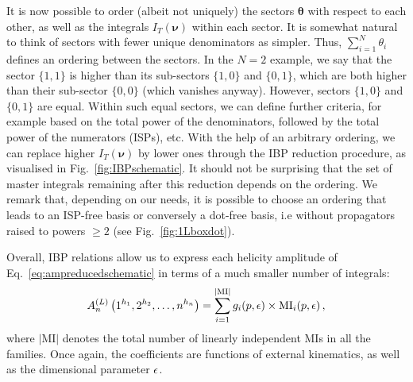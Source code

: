 \documentclass[main.tex]{subfiles}
\begin{document}
It is now possible to order (albeit not uniquely) the sectors $\bm{\theta}$ with respect to each other, as well as the integrals $I_T(\bm{\nu})$ within each sector. It is somewhat natural to think of sectors with fewer unique denominators as simpler. Thus, $\sum_{i=1}^N \theta_i$ defines an ordering between the sectors. In the $N=2$ example, we say that the sector $\{1, 1\}$ is higher than its sub-sectors $\{1, 0\}$ and $\{0, 1\}$, which are both higher than their sub-sector $\{0, 0\}$ (which vanishes anyway). However, sectors $\{1, 0\}$ and $\{0, 1\}$ are equal. Within such equal sectors, we can define further criteria, for example based on the total power of the denominators, followed by the total power of the numerators (ISPs), etc. With the help of an arbitrary ordering, we can replace higher $I_T(\bm{\nu})$ by lower ones through the IBP reduction procedure, as visualised in Fig.~\ref{fig:IBPschematic}. It should not be surprising that the set of master integrals remaining after this reduction depends on the ordering. We remark that, depending on our needs, it is possible to choose an ordering that leads to an ISP-free basis or conversely a dot-free basis, i.e without propagators raised to powers $\ge 2$ (see Fig.~\ref{fig:1Lboxdot}).

Overall, IBP relations allow us to express each helicity amplitude of Eq.~\ref{eq:ampreducedschematic} in terms of a much smaller number of integrals:
\begin{equation} \label{eq:ampafterIBP}
    	A_n^{(L)} \left(1^{h_1}, 2^{h_2}, \ldots, n^{h_n} \right) =  
     \sum_{i=1}^{|\text{MI}|} g_i(p, \epsilon) \times \text{MI}_i(p,\epsilon)\,,
\end{equation}
where $|\text{MI}|$ denotes the total number of linearly independent MIs in all the families. Once again, the coefficients are functions of external kinematics, as well as the dimensional parameter $\epsilon$. 
\end{document}
